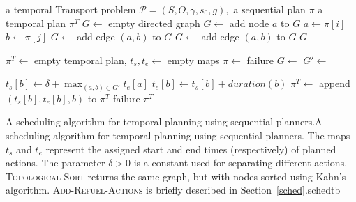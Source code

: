 %
{%
\Input a temporal Transport problem $\mathcal{P} = (S, O, \gamma, s_0, g),$
a sequential plan $\pi$
\Output a temporal plan $\pi^T$
\State $G \gets $ empty directed graph
\State $G \gets $ add node $a$ to $G$
\EndFor
{}
\State $a \gets \pi[i]$
\State $b \gets \pi[j]$
\State $G \gets $ add edge $(a, b)$ to $G$
\State $G \gets $ add edge $(a, b)$ to $G$
\EndIf
\EndFor
\EndFor
\State \Return $G$
\EndFunction

\State $\pi^T \gets $ empty temporal plan, $t_s, t_e \gets $ empty maps
\State $\pi \gets $ 
 \Return failure \EndIf
\State $G \gets $ 
\State $G' \gets $ 

\State $t_s[b] \gets \delta + \max_{(a, b) \in G'} t_e[a]$
\State $t_e[b] \gets t_s[b] + duration(b)$
\State $\pi^T \gets $ append $(t_s[b], t_e[b], b)$ to $\pi^T$
\EndFor
{}
\Return failure
\EndIf
\State \Return $\pi^T$
\EndFunction
}%
{A scheduling algorithm
for temporal planning using sequential planners.}{A scheduling algorithm
for temporal planning using sequential planners.
The maps $t_s$ and $t_e$ represent the assigned start and end times (respectively) of planned actions. The parameter $\delta > 0$ is a constant used for separating different actions.
\textsc{Topological-Sort} returns the same graph, but with nodes sorted
using Kahn's algorithm.
\textsc{Add-Refuel-Actions} is briefly described in Section~\ref{sched}.}{sched}{tb}

